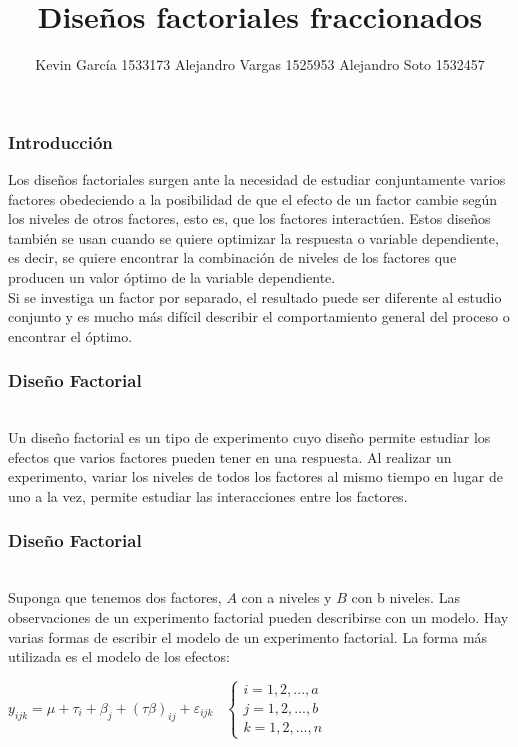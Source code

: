 \documentclass[12pt]{beamer}
\author[Kevin - Alejandro x2]{Kevin García 1533173 \newline Alejandro Vargas 1525953 \newline Alejandro Soto 1532457}
\title[Diseños factoriales fraccionados]{Diseños factoriales fraccionados}
\begin{document}
\justifying
\begin{frame}[plain]
\maketitle
\end{frame}


\begin{frame}
\frametitle{Introducción}
Los diseños factoriales surgen ante la necesidad de estudiar conjuntamente varios factores obedeciendo a la posibilidad de que el efecto de un factor cambie según los niveles de otros factores, esto es, que los factores interactúen. Estos diseños también se usan cuando se quiere
optimizar la respuesta o variable dependiente, es decir, se quiere encontrar la combinación de niveles de los factores que producen un valor óptimo de la variable dependiente.
~\\Si se investiga un factor por separado, el resultado puede ser diferente al estudio conjunto y es mucho más difícil describir el comportamiento general del proceso o encontrar el óptimo.
\end{frame}

\begin{frame}
\frametitle{Diseño Factorial}
~\\Un diseño factorial es un tipo de experimento cuyo diseño permite estudiar los efectos que varios factores pueden tener en una respuesta. Al realizar un experimento, variar los niveles de todos los factores al mismo tiempo en lugar de uno a la vez, permite estudiar las interacciones entre los factores.

\end{frame}

\begin{frame}
\frametitle{Diseño Factorial}
~\\Suponga que tenemos dos factores, $A$ con a niveles y $B$ con b niveles. Las observaciones de un experimento factorial pueden describirse con un modelo. Hay varias formas de escribir el modelo de un experimento factorial. La forma más utilizada es el modelo de los efectos:
\begin{center}
$y_{ijk}=\mu+\tau_i+\beta_j+(\tau\beta)_{ij}+\varepsilon_{ijk} \;\;\; \left \{\begin{array}{c} i=1,2,...,a \\ j=1,2,...,b \\ k=1,2,...,n \end{array}\right. $
\end{center}
\end{frame}
\end{document}
